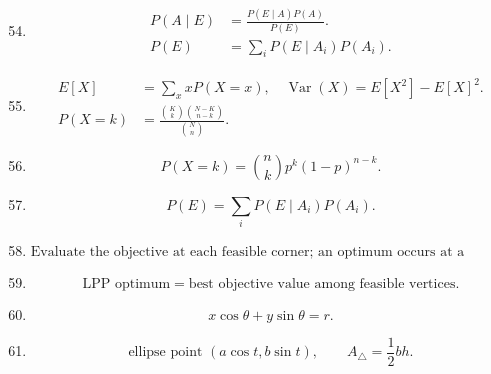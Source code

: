 \begin{enumerate}[label=\theenumi,leftmargin=4mm,itemsep=4pt]
\setcounter{enumi}{53}\item

\begin{align}
P(A\mid E)&=\frac{P(E\mid A)P(A)}{P(E)}.
\label{eq:bayes-54}\\
P(E)&=\sum_iP(E\mid A_i)P(A_i).
\label{eq:total-probability-54}
\end{align}

\setcounter{enumi}{54}\item

\begin{align}
E[X]&=\sum_x xP(X=x),\quad
\operatorname{Var}(X)=E[X^2]-E[X]^2.
\label{eq:mean-variance-55}\\
P(X=k)&=\frac{\binom Kk\binom{N-K}{n-k}}{\binom Nn}.
\label{eq:hypergeometric-55}
\end{align}

\setcounter{enumi}{55}\item

\begin{equation}
P(X=k)=\binom nkp^k(1-p)^{n-k}.
\label{eq:binomial-56}
\end{equation}

\setcounter{enumi}{56}\item

\begin{equation}
P(E)=\sum_iP(E\mid A_i)P(A_i).
\label{eq:total-probability-57}
\end{equation}

\setcounter{enumi}{58}\item

\begin{equation}
\text{Evaluate the objective at each feasible corner; an optimum occurs at a feasible vertex.}
\label{eq:lpp-59}
\end{equation}

\setcounter{enumi}{59}\item

\begin{equation}
\text{LPP optimum}=\text{best objective value among feasible vertices}.
\label{eq:lpp-60}
\end{equation}

\setcounter{enumi}{63}\item

\begin{equation}
x\cos\theta+y\sin\theta=r.
\label{eq:circle-tangent-64}
\end{equation}

\setcounter{enumi}{64}\item

\begin{equation}
\text{ellipse point }(a\cos t,b\sin t),\qquad
A_{\triangle}=\frac12 bh.
\label{eq:ellipse-area-65}
\end{equation}
\end{enumerate}

